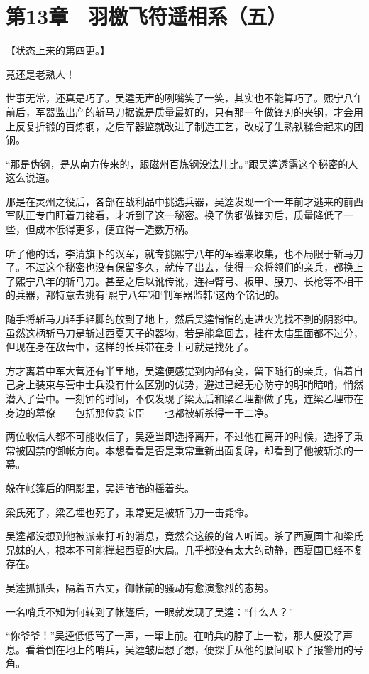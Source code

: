 \section{第13章　羽檄飞符遥相系（五）}

【状态上来的第四更。】

竟还是老熟人！

世事无常，还真是巧了。吴逵无声的咧嘴笑了一笑，其实也不能算巧了。熙宁八年前后，军器监出产的斩马刀据说是质量最好的，只有那一年做锋刃的夹钢，才会用上反复折锻的百炼钢，之后军器监就改进了制造工艺，改成了生熟铁糅合起来的团钢。

“那是伪钢，是从南方传来的，跟磁州百炼钢没法儿比。”跟吴逵透露这个秘密的人这么说道。

那是在灵州之役后，各部在战利品中挑选兵器，吴逵发现一个一年前才逃来的前西军队正专门盯着刀铭看，才听到了这一秘密。换了伪钢做锋刃后，质量降低了一些，但成本低得更多，便宜得一造数万柄。

听了他的话，李清旗下的汉军，就专挑熙宁八年的军器来收集，也不局限于斩马刀了。不过这个秘密也没有保留多久，就传了出去，使得一众将领们的亲兵，都换上了熙宁八年的斩马刀。甚至之后以讹传讹，连神臂弓、板甲、腰刀、长枪等不相干的兵器，都特意去挑有‘熙宁八年’和‘判军器监韩’这两个铭记的。

随手将斩马刀轻手轻脚的放到了地上，然后吴逵悄悄的走进火光找不到的阴影中。虽然这柄斩马刀是斩过西夏天子的器物，若是能拿回去，挂在太庙里面都不过分，但现在身在敌营中，这样的长兵带在身上可就是找死了。

方才离着中军大营还有半里地，吴逵便感觉到内部有变，留下随行的亲兵，借着自己身上装束与营中士兵没有什么区别的优势，避过已经无心防守的明哨暗哨，悄然潜入了营中。一刻钟的时间，不仅发现了梁太后和梁乙埋都做了鬼，连梁乙埋带在身边的幕僚——包括那位袁宝臣——也都被斩杀得一干二净。

两位收信人都不可能收信了，吴逵当即选择离开，不过他在离开的时候，选择了秉常被囚禁的御帐方向。本想看看是否是秉常重新出面复辟，却看到了他被斩杀的一幕。

躲在帐篷后的阴影里，吴逵暗暗的摇着头。

梁氏死了，梁乙埋也死了，秉常更是被斩马刀一击毙命。

吴逵都没想到他被派来打听的消息，竟然会这般的耸人听闻。杀了西夏国主和梁氏兄妹的人，根本不可能撑起西夏的大局。几乎都没有太大的动静，西夏国已经不复存在。

吴逵抓抓头，隔着五六丈，御帐前的骚动有愈演愈烈的态势。

一名哨兵不知为何转到了帐篷后，一眼就发现了吴逵：“什么人？”

“你爷爷！”吴逵低低骂了一声，一窜上前。在哨兵的脖子上一勒，那人便没了声息。看着倒在地上的哨兵，吴逵皱眉想了想，便探手从他的腰间取下了报警用的号角。

